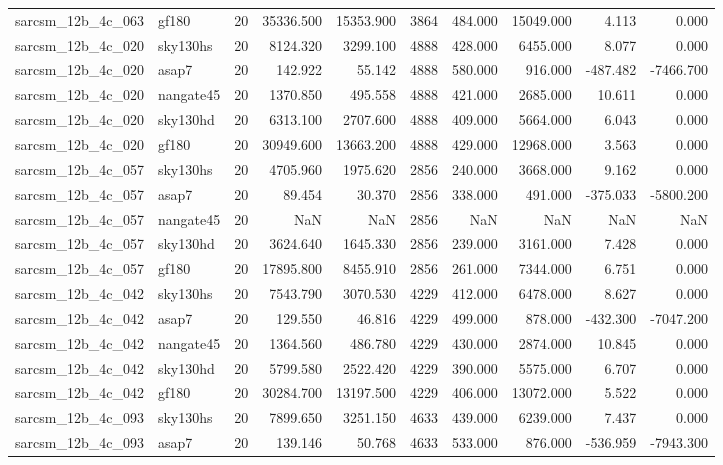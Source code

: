 \begin{longtable}{llrrrrrrrr}
sarcsm\_12b\_4c\_063 & gf180 & 20 & 35336.500 & 15353.900 & 3864 & 484.000 & 15049.000 & 4.113 & 0.000 \\
sarcsm\_12b\_4c\_020 & sky130hs & 20 & 8124.320 & 3299.100 & 4888 & 428.000 & 6455.000 & 8.077 & 0.000 \\
sarcsm\_12b\_4c\_020 & asap7 & 20 & 142.922 & 55.142 & 4888 & 580.000 & 916.000 & -487.482 & -7466.700 \\
sarcsm\_12b\_4c\_020 & nangate45 & 20 & 1370.850 & 495.558 & 4888 & 421.000 & 2685.000 & 10.611 & 0.000 \\
sarcsm\_12b\_4c\_020 & sky130hd & 20 & 6313.100 & 2707.600 & 4888 & 409.000 & 5664.000 & 6.043 & 0.000 \\
sarcsm\_12b\_4c\_020 & gf180 & 20 & 30949.600 & 13663.200 & 4888 & 429.000 & 12968.000 & 3.563 & 0.000 \\
sarcsm\_12b\_4c\_057 & sky130hs & 20 & 4705.960 & 1975.620 & 2856 & 240.000 & 3668.000 & 9.162 & 0.000 \\
sarcsm\_12b\_4c\_057 & asap7 & 20 & 89.454 & 30.370 & 2856 & 338.000 & 491.000 & -375.033 & -5800.200 \\
sarcsm\_12b\_4c\_057 & nangate45 & 20 & NaN & NaN & 2856 & NaN & NaN & NaN & NaN \\
sarcsm\_12b\_4c\_057 & sky130hd & 20 & 3624.640 & 1645.330 & 2856 & 239.000 & 3161.000 & 7.428 & 0.000 \\
sarcsm\_12b\_4c\_057 & gf180 & 20 & 17895.800 & 8455.910 & 2856 & 261.000 & 7344.000 & 6.751 & 0.000 \\
sarcsm\_12b\_4c\_042 & sky130hs & 20 & 7543.790 & 3070.530 & 4229 & 412.000 & 6478.000 & 8.627 & 0.000 \\
sarcsm\_12b\_4c\_042 & asap7 & 20 & 129.550 & 46.816 & 4229 & 499.000 & 878.000 & -432.300 & -7047.200 \\
sarcsm\_12b\_4c\_042 & nangate45 & 20 & 1364.560 & 486.780 & 4229 & 430.000 & 2874.000 & 10.845 & 0.000 \\
sarcsm\_12b\_4c\_042 & sky130hd & 20 & 5799.580 & 2522.420 & 4229 & 390.000 & 5575.000 & 6.707 & 0.000 \\
sarcsm\_12b\_4c\_042 & gf180 & 20 & 30284.700 & 13197.500 & 4229 & 406.000 & 13072.000 & 5.522 & 0.000 \\
sarcsm\_12b\_4c\_093 & sky130hs & 20 & 7899.650 & 3251.150 & 4633 & 439.000 & 6239.000 & 7.437 & 0.000 \\
sarcsm\_12b\_4c\_093 & asap7 & 20 & 139.146 & 50.768 & 4633 & 533.000 & 876.000 & -536.959 & -7943.300 \\

\end{longtable}
